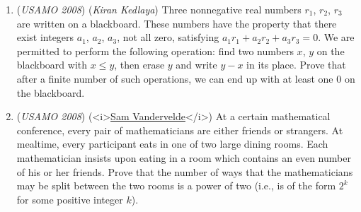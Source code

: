 \begin{enumerate}
 

	\item (\textit{USAMO 2008}) (\textit{Kiran Kedlaya}) Three nonnegative real numbers $r_1$, $r_2$, $r_3$ are written on a blackboard. These numbers have the property that there exist integers $a_1$, $a_2$, $a_3$, not all zero, satisfying $a_1r_1+a_2r_2+a_3r_3=0$. We are permitted to perform the following operation: find two numbers $x$, $y$ on the blackboard with $x\le y$, then erase $y$ and write $y-x$ in its place. Prove that after a finite number of such operations, we can end up with at least one $0$ on the blackboard.


 

	\item (\textit{USAMO 2008}) (<i>\href{https://artofproblemsolving.com/wiki/index.php?title=Sam\_Vandervelde}{Sam Vandervelde}</i>) At a certain mathematical conference, every pair of mathematicians are either friends or strangers. At mealtime, every participant eats in one of two large dining rooms. Each mathematician insists upon eating in a room which contains an even number of his or her friends. Prove that the number of ways that the mathematicians may be split between the two rooms is a power of two (i.e., is of the form $2^k$ for some positive integer $k$).


 

\end{enumerate}